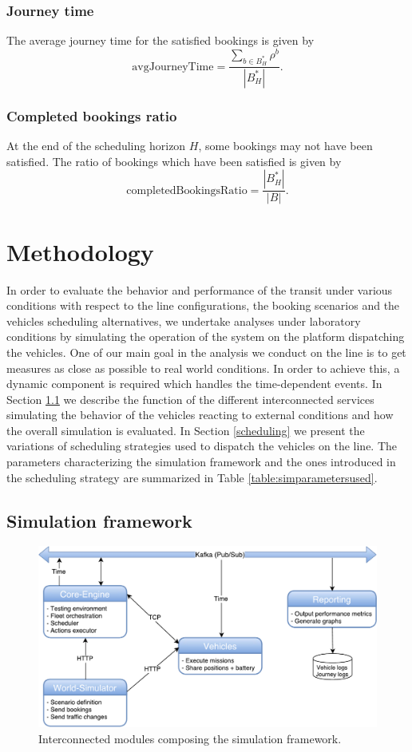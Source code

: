 \documentclass[12pt,a4paper]{article}
\begin{document}
\subsubsection{Journey time}
The average journey time for the satisfied bookings is given by
$$\text{avgJourneyTime} = \frac{\sum_{b \in B^{*}_{H}}\rho^{b}}{|B^{*}_{H}|}.$$

\subsubsection{Completed bookings ratio}
At the end of the scheduling horizon $H$, some bookings may not have been satisfied. The ratio of bookings which have been satisfied is given by
$$\text{completedBookingsRatio} = \frac{|B^{*}_{H}|}{|B|}.$$

\section{Methodology}\label{methodology}
In order to evaluate the behavior and performance of the transit under various conditions with respect to the line configurations, the booking scenarios and the vehicles scheduling alternatives, we undertake analyses under laboratory conditions by simulating the operation of the system on the platform dispatching the vehicles. One of our main goal in the analysis we conduct on the line is to get measures as close as possible to real world conditions. In order to achieve this, a dynamic component is required which handles the time-dependent events. In Section \ref{framework} we describe the function of the different interconnected services simulating the behavior of the vehicles reacting to external conditions and how the overall simulation is evaluated. In Section \ref{scheduling} we present the variations of scheduling strategies used to dispatch the vehicles on the line. The parameters characterizing the simulation framework and the ones introduced in the scheduling strategy are summarized in Table \ref{table:simparametersused}. 

\subsection{Simulation framework}\label{framework}
\setlength{\belowcaptionskip}{10pt}
\begin{figure} 
  \centering
\includegraphics[scale=0.55]{./images/SimulationFramework2.pdf}
\caption{Interconnected modules composing the simulation framework.}
\label{fig:simulationFramework}
\end{figure}
\end{document}
